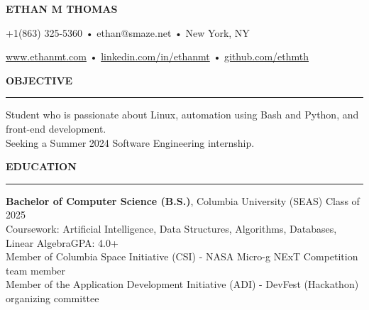 \documentclass[10pt,letterpaper]{article}
\begin{document}
\begingroup
\centerline{\MakeUppercase{\LARGE\bf Ethan M Thomas}} \medskip
\endgroup

\begingroup
\centerline{+1(863) 325-5360 • ethan@smaze.net • New York, NY}
\endgroup
\par

\begingroup
\centerline{\href{www.ethanmt.com}{www.ethanmt.com} • \href{https://www.linkedin.com/in/ethanmt/}{linkedin.com/in/ethanmt} • \href{https://github.com/ethmth}{github.com/ethmth}}
\endgroup
\par


\medskip
\MakeUppercase{{\bf Objective}} %
\medskip
\hrule %
\begin{list}{}{\setlength{\leftmargin}{0em}}
    \item
          {Student who is passionate about Linux, automation using Bash and Python, and front-end development.
          \\ Seeking a Summer 2024 Software Engineering internship.}
\end{list}



\medskip
\MakeUppercase{{\bf Education}}
\medskip
\hrule
\begin{list}{}{\setlength{\leftmargin}{0em}}
    \item
          {\bf Bachelor of Computer Science (B.S.)}, Columbia University (SEAS) \hfill  {Class of 2025}\\
          Coursework: Artificial Intelligence, Data Structures, Algorithms, Databases, Linear Algebra\hfill {GPA: 4.0+}
          \medskip
          \\
          Member of Columbia Space Initiative (CSI) - NASA Micro-g NExT Competition team member \\
          Member of the Application Development Initiative (ADI) - DevFest (Hackathon) organizing committee
\end{list}
\end{document}
